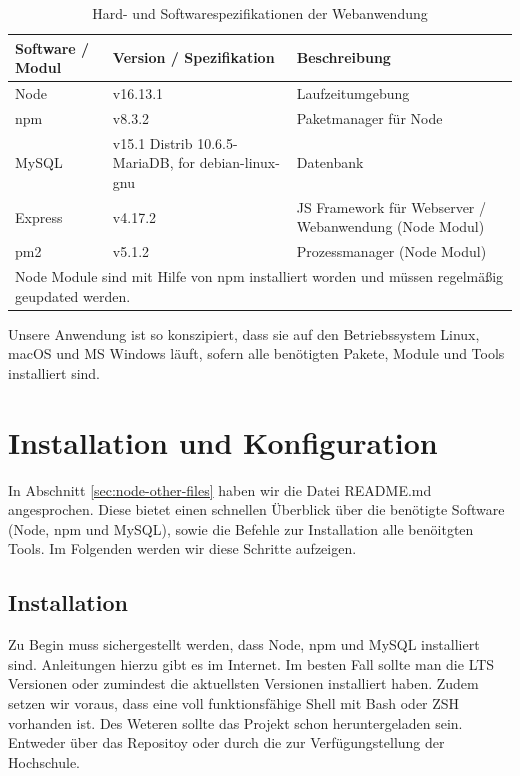 \begin{table}[H]
    \caption{Hard- und Softwarespezifikationen der Webanwendung}
    \label{tab:node-specs}
    \setlength{\tabcolsep}{3pt}
    \begin{tabular}{|p{70pt}|p{120pt}|p{180pt}|}
        \hline
        Software / Modul & Version / Spezifikation                            & Beschreibung                                           \\
        \hline\hline
        Node             & v16.13.1                                           & Laufzeitumgebung                                       \\
        \hline
        npm              & v8.3.2                                             & Paketmanager für Node                                  \\
        \hline
        MySQL            & v15.1 Distrib 10.6.5-MariaDB, for debian-linux-gnu & Datenbank                                              \\
        \hline
        Express          & v4.17.2                                            & JS Framework für Webserver / Webanwendung (Node Modul) \\
        \hline
        pm2              & v5.1.2                                             & Prozessmanager (Node Modul)                            \\
        \hline
        \multicolumn{3}{p{400pt}}{Node Module sind mit Hilfe von npm installiert worden und müssen regelmäßig geupdated werden.}
    \end{tabular}
\end{table}

Unsere Anwendung ist so konszipiert, dass sie auf den Betriebssystem Linux, macOS und MS Windows läuft, sofern alle benötigten Pakete,
Module und Tools installiert sind.

\newpage
\section{Installation und Konfiguration}
\label{sec:nodechapter-installation}
In Abschnitt \ref{sec:node-other-files} haben wir die Datei README.md angesprochen. Diese bietet einen schnellen Überblick über
die benötigte Software (Node, npm und MySQL), sowie die Befehle zur Installation alle benöitgten Tools. Im Folgenden werden wir
diese Schritte aufzeigen.

\subsection*{Installation}
\label{sec:nodechapter-installation}
Zu Begin muss sichergestellt werden, dass Node, npm und MySQL installiert sind. Anleitungen hierzu gibt es im Internet. Im besten Fall
sollte man die LTS Versionen oder zumindest die aktuellsten Versionen installiert haben. Zudem setzen wir voraus, dass eine voll funktionsfähige
Shell mit Bash oder ZSH vorhanden ist. Des Weteren sollte das Projekt schon heruntergeladen sein. Entweder über das Repositoy oder
durch die zur Verfügungstellung der Hochschule.

